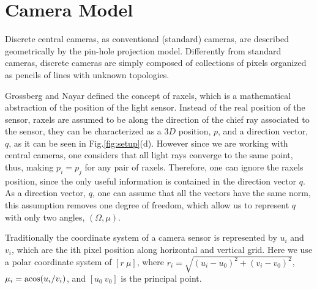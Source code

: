 \section{Camera Model}





Discrete central cameras, as conventional (standard) cameras, are described geometrically by the pin-hole projection model. Differently from standard cameras, discrete cameras are simply composed of collections of pixels organized as pencils of lines with unknown topologies.
%

Grossberg and Nayar\cite{Raxels} defined the concept of raxels, which is a mathematical abstraction of the position of the light sensor. Instead of the real position of the sensor, raxels are assumed to be along the direction of the chief ray associated to the sensor, they can be characterized as a $3D$ position, $p$, and a direction vector, $q$, as it can be seen in Fig.\ref{fig:setup}(d).
%
However since we are working with central cameras, one considers that all light rays converge to the same point, thus, making $p_i=p_j$ for any pair of raxels. Therefore, one can ignore the raxels position, since the only useful information is contained in the direction vector $q$. As a direction vector, $q$, one can assume that all the vectors have the same norm, this assumption removes one degree of freedom, which allow us to represent $q$ with only two angles, $(\Omega,\mu)$.

Traditionally the coordinate system of a camera sensor is represented by $u_i$ and $v_i$, which are the ith pixel position along horizontal and vertical grid. Here we use a polar coordinate system of $[r\ \mu]$, where $r_i=\sqrt{(u_i-u_0)^2+(v_i-v_0)^2}$, $\mu_i =\operatorname{acos} (u_i/v_i)$, and $[u_0\ v_0]$ is the principal point. %


